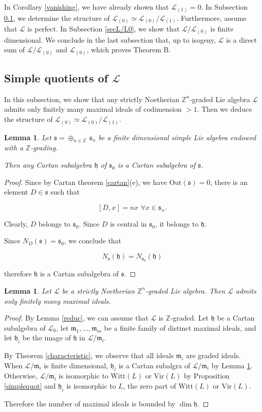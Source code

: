 \documentclass[11pt, letterpaper, reqno]{amsart}
\newtheorem{lemma}[theorem]{Lemma}
\theoremstyle{definition}
\newcommand{\Z}{{\mathbb Z}}
\newcommand{\cL}{\mathcal L}
\newcommand{\fh}{\mathfrak{h}}
\newcommand{\fm}{\mathfrak{m}}
\newcommand{\fs}{\mathfrak{s}}
\newcommand{\Out}{\mathrm{Out}}
\newcommand{\Vir}{\mathrm{Vir}}
\newcommand{\Witt}{\mathrm{Witt}}
\begin{document}
In Corollary 
\ref{vanishing}, we have already shown that
$\cL_{(1)}=0$. 
In Subsection \ref{L0/L1}, we determine
the structure of 
$\cL_{(0)}\simeq \cL_{(0)}/\cL_{(1)}$.
Furthermore, assume that $\cL$ is perfect.
In Subsection \ref{secL/L0}, we show that
$\cL/\cL_{(0)}$ is finite dimensional.
We conclude in the last subsection that,
up to isogeny, $\cL$ is a direct sum of
$\cL/\cL_{(0)}$ and $\cL_{(0)}$, which
proves Theorem B.



\subsection{Simple quotients of $\cL$}
\label{L0/L1}

In this subsection, we show that any strictly Noetherian
$\Z^n$-graded Lie algebra $\cL$ admits only finitely many maximal ideals of codimension $>1$. Then we deduce the structure of
$\cL_{(0)}\simeq \cL_{(0)}/\cL_{(1)}$.

\begin{lemma}\label{imageCSA} Let 
$\fs=\oplus_{n\in \Z}\, \fs_n$ be a finite dimensional simple Lie algebra endowed with a $\Z$-grading.

Then any Cartan subalgebra $\fh$ of $\fs_0$ is a
Cartan subalgebra of $\fs$.
\end{lemma}

\begin{proof} Since by Cartan theorem \ref{cartan}(e),
we have $\Out(\fs)=0$, there is an element $D\in \fs$ such that

$$[D,x]=nx\,\,\forall x\in \fs_n.$$

\noindent Clearly, $D$ belongs to $\fs_0$. Since
$D$ is central in $\fs_0$, it belongs to
$\fh$. 

Since $N_D(\fs)=\fs_0$, we conclude that

$$N_\fs(\fh)=N_{\fs_0}(\fh)$$

\noindent therefore $\fh$ is a Cartan subalgebra of $\fs$.
\end{proof}

\begin{lemma}\label{finite} Let $\cL$ be a strictly Noetherian
$\Z^n$-graded Lie algebra.
Then $\cL$ admits only finitely many maximal ideals.
\end{lemma}

\begin{proof} By Lemma \ref{reduc},
we can assume that $\cL$ is $\Z$-graded.
Let $\fh$ be a Cartan subalgebra of $\cL_0$,
let $\fm_1,\ldots,\fm_m$ be a finite family of distinct maximal ideals, and let
$\fh_i$ be the image of $\fh$ in $\cL/\fm_i$.

By Theorem \ref{characteristic}, we observe that all ideals
$\fm_i$ are graded ideals. When $\cL/\fm_i$ is finite dimensional,
$\fh_i$ is a Cartan subalgra of $\cL/\fm_i$ by
Lemma \ref{imageCSA}.
Otherwise, $\cL/\fm_i$ is isomorphic to
$\Witt(L)$ or $\Vir(L)$ by Proposition
\ref{simplequot} and $\fh_i$ is isomorphic to $L$, the zero part of $\Witt(L)$ or $\Vir(L)$.

Therefore the number of maximal ideals is bounded by $\dim \fh$.
\end{proof}
\end{document}

